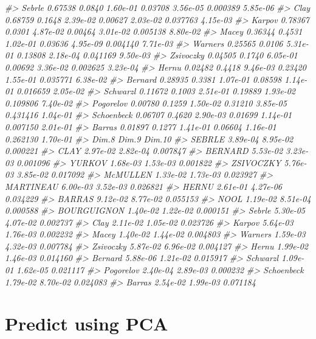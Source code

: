 \documentclass[]{book}
\newenvironment{Shaded}{\begin{snugshade}}{\end{snugshade}}
\newcommand{\CommentTok}[1]{\textcolor[rgb]{0.56,0.35,0.01}{\textit{#1}}}
\begin{document}
\begin{Shaded}
\begin{Highlighting}[]
\CommentTok{#> Sebrle      0.67538 0.0840 1.60e-01 0.03708 3.56e-05 0.000389 5.85e-06}
\CommentTok{#> Clay        0.68759 0.1648 2.39e-02 0.00627 2.03e-02 0.037763 4.15e-03}
\CommentTok{#> Karpov      0.78367 0.0301 4.87e-02 0.00464 3.01e-02 0.005138 8.80e-02}
\CommentTok{#> Macey       0.36344 0.4531 1.02e-01 0.03636 4.95e-09 0.004140 7.71e-03}
\CommentTok{#> Warners     0.25565 0.0106 5.31e-01 0.13808 2.18e-04 0.041169 9.50e-03}
\CommentTok{#> Zsivoczky   0.04505 0.1740 6.05e-01 0.00692 3.36e-02 0.002625 3.23e-04}
\CommentTok{#> Hernu       0.02482 0.4418 9.46e-03 0.23420 1.55e-01 0.035771 6.38e-02}
\CommentTok{#> Bernard     0.28935 0.3381 1.07e-01 0.08598 1.14e-01 0.016659 2.05e-02}
\CommentTok{#> Schwarzl    0.11672 0.1003 2.51e-01 0.19889 1.93e-02 0.109806 7.40e-02}
\CommentTok{#> Pogorelov   0.00780 0.1259 1.50e-02 0.31210 3.85e-05 0.431416 1.04e-01}
\CommentTok{#> Schoenbeck  0.06707 0.4620 2.90e-03 0.01699 1.14e-01 0.007150 2.01e-01}
\CommentTok{#> Barras      0.01897 0.1277 1.41e-01 0.06604 1.16e-01 0.262130 1.70e-01}
\CommentTok{#>                Dim.8    Dim.9   Dim.10}
\CommentTok{#> SEBRLE      3.89e-04 8.95e-02 0.000221}
\CommentTok{#> CLAY        2.97e-02 2.82e-04 0.007847}
\CommentTok{#> BERNARD     5.53e-02 3.23e-03 0.001096}
\CommentTok{#> YURKOV      1.68e-03 1.53e-03 0.001822}
\CommentTok{#> ZSIVOCZKY   5.76e-03 3.85e-02 0.017092}
\CommentTok{#> McMULLEN    1.33e-02 1.73e-03 0.023927}
\CommentTok{#> MARTINEAU   6.00e-03 3.52e-03 0.026821}
\CommentTok{#> HERNU       2.61e-01 4.27e-06 0.034229}
\CommentTok{#> BARRAS      9.12e-02 8.77e-02 0.055153}
\CommentTok{#> NOOL        1.19e-02 8.51e-04 0.000588}
\CommentTok{#> BOURGUIGNON 1.40e-02 1.22e-02 0.000151}
\CommentTok{#> Sebrle      5.30e-05 4.07e-02 0.002737}
\CommentTok{#> Clay        2.11e-02 1.05e-02 0.023726}
\CommentTok{#> Karpov      5.64e-03 1.76e-03 0.002232}
\CommentTok{#> Macey       1.40e-02 1.44e-02 0.004803}
\CommentTok{#> Warners     1.59e-03 4.32e-03 0.007784}
\CommentTok{#> Zsivoczky   5.87e-02 6.96e-02 0.004127}
\CommentTok{#> Hernu       1.99e-02 1.46e-03 0.014160}
\CommentTok{#> Bernard     5.88e-06 1.21e-02 0.015917}
\CommentTok{#> Schwarzl    1.09e-01 1.62e-05 0.021117}
\CommentTok{#> Pogorelov   2.40e-04 2.89e-03 0.000232}
\CommentTok{#> Schoenbeck  1.79e-02 8.70e-02 0.024083}
\CommentTok{#> Barras      2.54e-02 1.99e-03 0.071184}
\end{Highlighting}
\end{Shaded}

\hypertarget{predict-using-pca}{%
\section{Predict using PCA}\label{predict-using-pca}}
\end{document}
